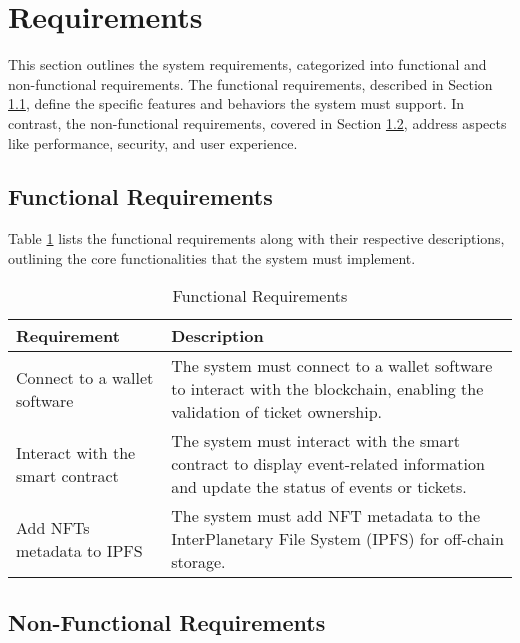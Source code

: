 \section{Requirements}
\label{sec:requirements}

This section outlines the system requirements, categorized into functional and
non-functional requirements. The functional requirements, described in Section
\ref{subsec:functional_requirements}, define the specific features and
behaviors the system must support. In contrast, the non-functional
requirements, covered in Section \ref{subsec:non_functional_requirements},
address aspects like performance, security, and user experience.

\subsection{Functional Requirements}
\label{subsec:functional_requirements}

Table \ref{tab:functional_requirements} lists the functional requirements along
with their respective descriptions, outlining the core functionalities that the
system must implement.

\begin{table}[H]
    \centering
    \begin{tabularx}{\textwidth}{lX}
        \hline
        \textbf{Requirement}             & \textbf{Description}                                                                                                              \\
        \hline
        Connect to a wallet software     & The system must connect to a wallet software to interact with the blockchain, enabling the validation of ticket ownership.        \\
        \hline
        Interact with the smart contract & The system must interact with the smart contract to display event-related information and update the status of events or tickets. \\
        \hline
        Add NFTs metadata to IPFS        & The system must add NFT metadata to the InterPlanetary File System (IPFS) for off-chain storage.                                  \\
        \hline
    \end{tabularx}
    \caption{Functional Requirements}
    \label{tab:functional_requirements}
\end{table}

\subsection{Non-Functional Requirements}
\label{subsec:non_functional_requirements}


